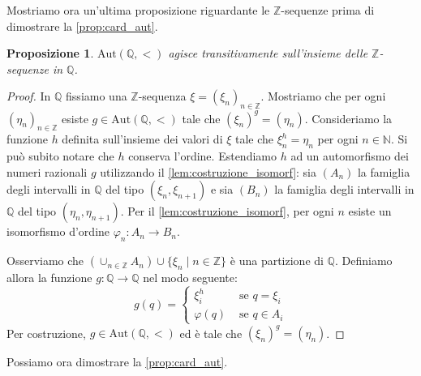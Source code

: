 \documentclass[12pt,a4paper,openright]{report}
\newcommand{\aut}{ \mathrm{Aut} ( \mathbb{Q},< ) } %
\newcommand{\N}{\mathbb{N}} %
\newcommand{\Z}{\mathbb{Z}} %
\newcommand{\Q}{\mathbb{Q}} %
\newcommand{\0}{\setminus\{0\}} %
\theoremstyle{definition}
\theoremstyle{plain}
\newtheorem{prop}[defn]{Proposizione}
\begin{document}
Mostriamo ora un'ultima proposizione riguardante le $\Z$-sequenze prima di dimostrare la \cref{prop:card_aut}.
\begin{prop} \label{prop:Z_seq_trans}
    $\aut$ agisce transitivamente sull'insieme delle $\Z$-sequenze in $\Q$.
\end{prop}
\begin{proof}
    In $\Q$ fissiamo una $\Z$-sequenza $\xi=\left(\xi_n\right)_{n \in \Z}$. Mostriamo che per ogni $\left(\eta_n\right)_{n \in \Z}$ esiste $g \in \aut$ tale che $\left(\xi_n\right)^g=\left(\eta_n\right)$. Consideriamo la funzione $h$ definita sull'insieme dei valori di $\xi$ tale che $\xi_n^h=\eta_n$ per ogni $n \in \N$. Si può subito notare che $h$ conserva l'ordine. 
    Estendiamo $h$ ad un automorfismo dei numeri razionali $g$ utilizzando il \cref{lem:costruzione_isomorf}: sia $\left(A_n\right)$ la famiglia degli intervalli in $\Q$ del tipo $\left(\xi_{n},\xi_{n+1}\right)$ e sia $\left(B_n\right)$ la famiglia degli intervalli in $\Q$ del tipo $\left(\eta_{n},\eta_{n+1}\right)$. Per il \cref{lem:costruzione_isomorf}, per ogni $n$ esiste un isomorfismo d'ordine $\varphi_n: A_n \rightarrow B_n$. 

    Osserviamo che $\left(\cup_{n \in \Z}A_n\right)\cup\{\xi_n \mid n \in \Z\}$ è una partizione di $\Q$. Definiamo allora la funzione $g: \Q \rightarrow \Q$ nel modo seguente:
    \[ g(q)=\begin{cases}\xi_i^h & \mbox{ se } q=\xi_i \\ \varphi(q) & \mbox{ se } q \in A_i \end{cases}\]
    Per costruzione, $g \in \aut$ ed è tale che $\left(\xi_n\right)^g=\left(\eta_n\right)$.
\end{proof}
Possiamo ora dimostrare la \cref{prop:card_aut}.
\end{document}
